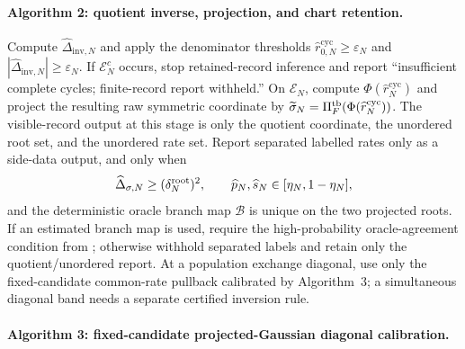 \paragraph{Algorithm 2: quotient inverse, projection, and chart retention.}

Compute \(\widehat\Delta_{\mathrm{inv},N}\) and apply the denominator thresholds
\(\widehat r_{0,N}^{\mathrm{cyc}}\ge\varepsilon_N\) and
\(|\widehat\Delta_{\mathrm{inv},N}|\ge\varepsilon_N\).  If \(\mathcal E_N^c\) occurs, stop
retained-record inference and report ``insufficient complete cycles;
finite-record report withheld.''  On \(\mathcal E_N\), compute
\(\Phi(\widehat r_N^{\mathrm{cyc}})\) and project the resulting raw symmetric
coordinate by
\(\widetilde\sigma_N=\Pi_F^{\rm tb}(\Phi(\widehat r_N^{\mathrm{cyc}}))\).
The visible-record output at this stage is only the quotient coordinate, the
unordered root set, and the unordered rate set.  Report separated labelled
rates only as a side-data output, and only when
\[
\widehat\Delta_{\sigma,N}\ge(\delta_N^{\rm root})^2,
\qquad
\widehat p_N,\widehat s_N\in[\eta_N,1-\eta_N],
\]
and the deterministic oracle branch map \(\mathcal B\) is unique on the two
projected roots.  If an estimated branch map is used, require the
high-probability oracle-agreement condition from
; otherwise withhold separated
labels and retain only the quotient/unordered report.  At a population
exchange diagonal, use only the fixed-candidate common-rate pullback calibrated
by Algorithm~3; a simultaneous diagonal band needs a separate certified
inversion rule.

\paragraph{Algorithm 3: fixed-candidate projected-Gaussian diagonal calibration.}

